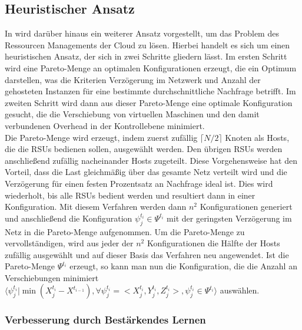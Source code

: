 \documentclass[conference]{IEEEtran}
\begin{document}
\subsection{Heuristischer Ansatz}
In \cite{IEEEhowto:orig} wird darüber hinaus ein weiterer Ansatz vorgestellt, um das Problem des Ressourcen Managements der Cloud zu lösen. Hierbei handelt es sich um einen heuristischen Ansatz, der sich in zwei Schritte gliedern lässt. Im ersten Schritt wird eine Pareto-Menge an optimalen Konfigurationen erzeugt, die ein Optimum darstellen, was die Kriterien Verzögerung im Netzwerk und Anzahl der gehosteten Instanzen für eine bestimmte durchschnittliche Nachfrage betrifft. Im zweiten Schritt wird dann aus dieser Pareto-Menge eine optimale Konfiguration gesucht, die die Verschiebung von virtuellen Maschinen und den damit verbundenen Overhead in der Kontrollebene minimiert. \\
Die Pareto-Menge wird erzeugt, indem zuerst zufällig \(\lceil N/2 \rceil\) Knoten als Hosts, die die RSUs bedienen sollen, ausgewählt werden. Den übrigen RSUs werden anschließend zufällig nacheinander Hosts zugeteilt. Diese Vorgehensweise hat den Vorteil, dass die Last gleichmäßig über das gesamte Netz verteilt wird und die Verzögerung für einen festen Prozentsatz an Nachfrage ideal ist.
Dies wird wiederholt, bis alle RSUs bedient werden und resultiert dann in einer Konfiguration.
Mit diesem Verfahren werden dann \(n^2\) Konfigurationen generiert und anschließend die Konfiguration \(\psi_j^{t_i} \in \Psi^{t_i}\) mit der geringsten Verzögerung im Netz in die Pareto-Menge aufgenommen.
Um die Pareto-Menge zu vervollständigen, wird aus jeder der \(n^2\) Konfigurationen  die Hälfte der Hosts zufällig ausgewählt und auf dieser Basis das Verfahren neu angewendet. 
Ist die Pareto-Menge \(\Psi^{t_i}\) erzeugt, so kann man nun die Konfiguration, die die Anzahl an Verschiebungen minimiert \(\langle \psi_{j}^{t_i}|\min(X_{j}^{t_i}-X^{t_{i-1}}),\forall \psi_{j}^{t_i}=<X_{j}^{t_i},Y_{j}^{t_i},Z_{j}^{t_i}>, \psi_{j}^{t_i} \in \Psi^{t_i}  \rangle\) auswählen.


\subsubsection{Verbesserung durch Bestärkendes Lernen}
\end{document}

